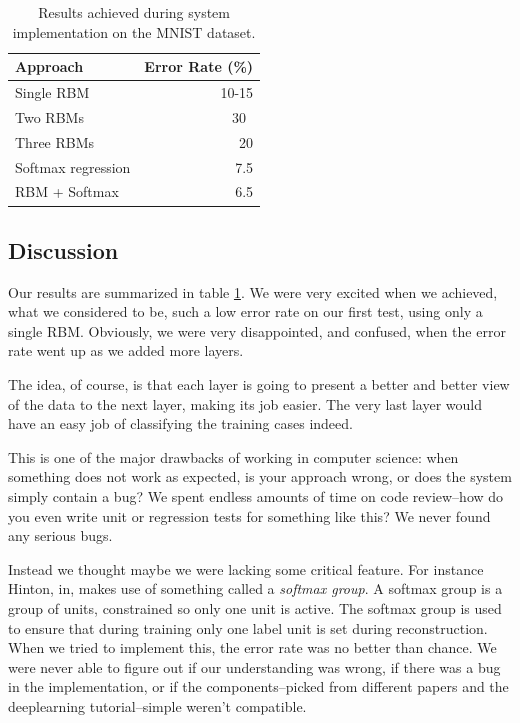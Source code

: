 \documentclass[11pt]{article}
\begin{document}
\begin{table}[htb!]
\centering
\begin{tabular}{|l|r|}        \hline
Approach & Error Rate (\%) \\ \hline
Single RBM & 10-15 \\         \hline
Two RBMs & 30\ \\             \hline
Three RBMs & 20 \\            \hline
Softmax regression & 7.5 \\   \hline
RBM + Softmax & 6.5 \\        \hline
\end{tabular}
\caption{Results achieved during system implementation on the MNIST dataset.}
\label{tbl:results}
\end{table}

\subsection{Discussion}

Our results are summarized in table \ref{tbl:results}.  We were very excited when we achieved, what we considered to be, such a low error rate on our first test, using only a single RBM.  Obviously, we were very disappointed, and confused, when the error rate went up as we added more layers.

The idea, of course, is that each layer is going to present a better and better view of the data to the next layer, making its job easier.  The very last layer would have an easy job of classifying the training cases indeed.

This is one of the major drawbacks of working in computer science: when something does not work as expected, is your approach wrong, or does the system simply contain a bug?  We spent endless amounts of time on code review--how do you even write unit or regression tests for something like this? We never found any serious bugs.

Instead we thought maybe we were lacking some critical feature. For instance Hinton, in\cite{hinton06}, makes use of something called a \textit{softmax group}.  A softmax group is a group of units, constrained so only one unit is active.  The softmax group is used to ensure that during training only one label unit is set during reconstruction.  When we tried to implement this, the error rate was no better than chance.  We were never able to figure out if our understanding was wrong, if there was a bug in the implementation, or if the components--picked from different papers and the deeplearning tutorial--simple weren't compatible.
\end{document}

